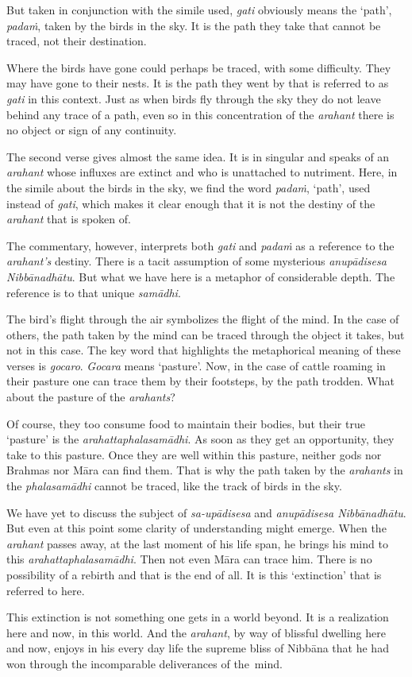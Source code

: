 But taken in conjunction with the simile used, \emph{gati} obviously means the `path', \emph{padaṁ}, taken by the birds in the sky. It is the path they take that cannot be traced, not their destination.

Where the birds have gone could perhaps be traced, with some difficulty. They may have gone to their nests. It is the path they went by that is referred to as \emph{gati} in this context. Just as when birds fly through the sky they do not leave behind any trace of a path, even so in this concentration of the \emph{arahant} there is no object or sign of any continuity.

The second verse gives almost the same idea. It is in singular and speaks of an \emph{arahant} whose influxes are extinct and who is unattached to nutriment. Here, in the simile about the birds in the sky, we find the word \emph{padaṁ}, `path', used instead of \emph{gati}, which makes it clear enough that it is not the destiny of the \emph{arahant} that is spoken of.

The commentary, however, interprets both \emph{gati} and \emph{padaṁ} as a reference to the \emph{arahant's} destiny. There is a tacit assumption of some mysterious \emph{anupādisesa Nibbānadhātu}. But what we have here is a metaphor of considerable depth. The reference is to that unique \emph{samādhi}.

The bird's flight through the air symbolizes the flight of the mind. In the case of others, the path taken by the mind can be traced through the object it takes, but not in this case. The key word that highlights the metaphorical meaning of these verses is \emph{gocaro}. \emph{Gocara} means `pasture'. Now, in the case of cattle roaming in their pasture one can trace them by their footsteps, by the path trodden. What about the pasture of the \emph{arahants}?

Of course, they too consume food to maintain their bodies, but their true `pasture' is the \emph{arahattaphalasamādhi}. As soon as they get an opportunity, they take to this pasture. Once they are well within this pasture, neither gods nor Brahmas nor Māra can find them. That is why the path taken by the \emph{arahants} in the \emph{phalasamādhi} cannot be traced, like the track of birds in the sky.

We have yet to discuss the subject of \emph{sa-upādisesa} and \emph{anupādisesa Nibbānadhātu}. But even at this point some clarity of understanding might emerge. When the \emph{arahant} passes away, at the last moment of his life span, he brings his mind to this \emph{arahattaphalasamādhi}. Then not even Māra can trace him. There is no possibility of a rebirth and that is the end of all. It is this `extinction' that is referred to here.

This extinction is not something one gets in a world beyond. It is a realization here and now, in this world. And the \emph{arahant}, by way of blissful dwelling here and now, enjoys in his every day life the supreme bliss of Nibbāna that he had won through the incomparable deliverances of the~mind.
